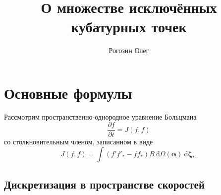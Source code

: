 \documentclass[a4paper,12pt]{article}
\title{О множестве исключённых кубатурных точек}
\author{Рогозин Олег}
\newcommand{\dd}{\:\mathrm{d}}
\newcommand{\pder}[2][]{\frac{\partial#1}{\partial#2}}
\newcommand{\dzeta}{\boldsymbol{\dd\zeta}}
\begin{document}
\maketitle
\tableofcontents

\section{Основные формулы}

Рассмотрим пространственно-однородное уравнение Больцмана
\begin{equation}\label{eq:Boltzmann}
    \pder[f]{t} = J(f,f)
\end{equation}
со столкновительным членом, записанном в виде
\begin{equation}\label{eq:ci}
    J(f,f) = \int (f'f'_*-ff_*)B\dd\Omega(\boldsymbol\alpha)\dzeta_*.
\end{equation}

\subsection{Дискретизация в пространстве скоростей}
\end{document}
